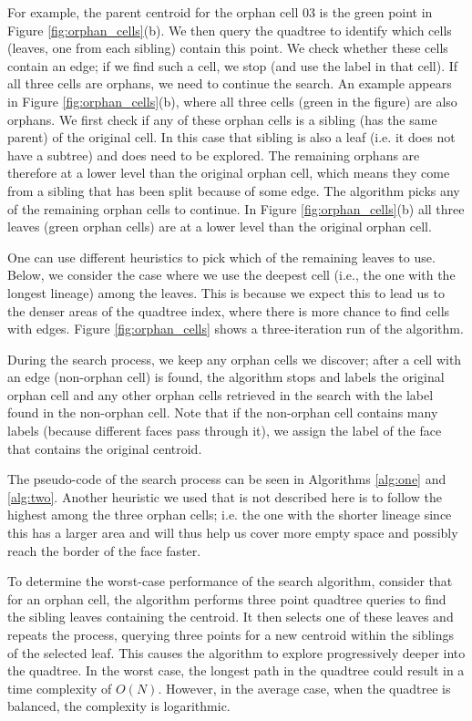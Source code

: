 For example, the parent centroid for the orphan cell 03 is the green point in Figure \ref{fig:orphan_cells}(b). We then query the quadtree to identify which cells (leaves, one from each sibling) contain this point. We check whether these cells contain an edge; if we find such a cell, we stop (and use the label in that cell). If all three cells are orphans, we need to continue the search. 
An example appears in Figure \ref{fig:orphan_cells}(b), where all three cells (green in the figure) are also orphans.
We first check if any of these orphan cells is a sibling (has the same parent) of the original cell. In this case that sibling is also a leaf (i.e. it does not have a subtree) and does need to be explored.
The remaining orphans are therefore at a lower level than the original orphan cell, which means they come from a sibling that has been split because of some edge. The algorithm picks any of the remaining orphan cells to continue. In Figure \ref{fig:orphan_cells}(b) all three leaves (green orphan cells) are at a lower level than the original orphan cell. 

One can use different heuristics to pick which of the remaining leaves to use. Below, we consider the case where we use the deepest cell (i.e., the one with the longest lineage) among the leaves. This is because we expect this to lead us to the denser areas of the quadtree index, where there is more chance to find cells with edges. Figure \ref{fig:orphan_cells} shows a three-iteration run of the algorithm. 

During the search process, we keep any orphan cells we discover; after a cell with an edge (non-orphan cell) is found, the algorithm stops and labels the original orphan cell and any other orphan cells retrieved in the search with the label found in the non-orphan cell. Note that if the non-orphan cell contains many labels (because different faces pass through it), we assign the label of the face that contains the original centroid.

The pseudo-code of the search process can be seen in Algorithms \ref{alg:one} and \ref{alg:two}. Another heuristic we used that is not described here is to follow the highest among the three orphan cells; i.e. the one with the shorter lineage since this has a larger area and will thus help us cover more empty space and possibly reach the border of the face faster.

To determine the worst-case performance of the search algorithm, consider that for an orphan cell, the algorithm performs three point quadtree queries to find the sibling leaves containing the centroid. It then selects one of these leaves and repeats the process, querying three points for a new centroid within the siblings of the selected leaf. This causes the algorithm to explore progressively deeper into the quadtree. In the worst case, the longest path in the quadtree could result in a time complexity of $O(N)$. However, in the average case, when the quadtree is balanced, the complexity is logarithmic.

